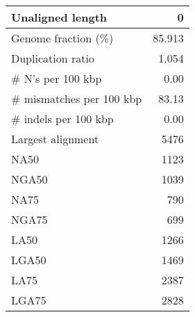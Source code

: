 \documentclass[12pt,a4paper]{article}
\begin{document}
\begin{table}[ht]
\begin{center}
\begin{tabular}{|l*{1}{|r}|}
Unaligned length & 0 \\ \hline
Genome fraction (\%) & 85.913 \\ \hline
Duplication ratio & 1.054 \\ \hline
\# N's per 100 kbp & 0.00 \\ \hline
\# mismatches per 100 kbp & 83.13 \\ \hline
\# indels per 100 kbp & 0.00 \\ \hline
Largest alignment & 5476 \\ \hline
NA50 & 1123 \\ \hline
NGA50 & 1039 \\ \hline
NA75 & 790 \\ \hline
NGA75 & 699 \\ \hline
LA50 & 1266 \\ \hline
LGA50 & 1469 \\ \hline
LA75 & 2387 \\ \hline
LGA75 & 2828 \\ \hline
\end{tabular}
\end{center}
\end{table}
\end{document}
